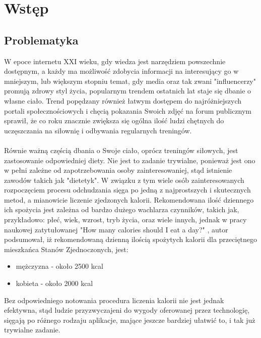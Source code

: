 \documentclass[12pt, a4paper]{article}
\begin{document}
\begin{sloppypar}


\tableofcontents
\newpage

\section{Wstęp}
{
  \subsection{Problematyka}
  {
    W epoce internetu XXI wieku, gdy wiedza jest narzędziem powszechnie dostępnym, a 
    każdy ma możliwość zdobycia informacji na interesujący go w mniejszym,
    lub większym stopniu temat, gdy media oraz tak zwani "influencerzy" promują zdrowy
    styl życia, popularnym trendem ostatnich lat staje się dbanie o własne ciało. 
    Trend popędzany również łatwym dostępem do najróżniejszych portali
    społecznościowych i chęcią pokazania Swoich zdjęć na forum publicznym sprawił, 
    że co roku znacznie zwiększa się ogólna ilość ludzi chętnych do uczęszczania na
    siłownię i odbywania regularnych treningów.
    \\ \\
    Równie ważną częścią dbania o Swoje ciało, oprócz treningów siłowych, jest 
    zastosowanie odpowiedniej diety. Nie jest to zadanie trywialne, ponieważ jest 
    ono w pełni zależne od zapotrzebowania osoby zainteresowaniej, stąd istnienie
    zawodów takich jak "dietetyk". W związku z tym wiele osób zainteresowanych
    rozpoczęciem procesu odchudzania sięga po jedną z najprostszych i skutecznych
    metod, a mianowicie liczenie zjedzonych kalorii. Rekomendowana ilość
    dziennego ich spożycia jest zależna od bardzo dużego wachlarza czynników, 
    takich jak, przykładowo: płeć, wiek, wzrost, tryb życia, oraz wiele innych, 
    jednak w pracy naukowej zatytułowanej "How many calories should I eat a day?"
    \cite{cal}, autor podsumował, iż rekomendowaną dzienną ilością spożytych kalorii 
    dla przeciętnego mieszkańca Stanów Zjednoczonych, jest:
    \begin{itemize}
      \item mężczyzna - około 2500 kcal
      \item kobieta - około 2000 kcal
    \end{itemize}
    Bez odpowiedniego notowania procedura liczenia kalorii nie jest jednak efektywna, 
    stąd ludzie przyzwyczajeni do wygody oferowanej przez technologię, sięgają po 
    różnego rodzaju aplikacje, mające jeszcze bardziej ułatwić to, i tak już trywialne
    zadanie.

}}
\end{sloppypar}
\end{document}

